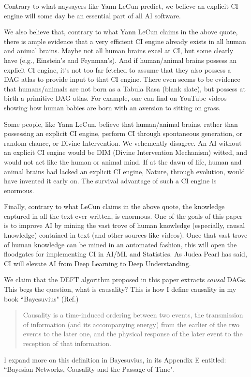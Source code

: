 \documentclass[12pt]{article}
\begin{document}
Contrary to what naysayers
like Yann LeCun predict,
we believe an 
explicit CI engine 
will some day be 
an essential part of all AI
software. 

We also believe that,
contrary to what Yann LeCun claims
in the above quote,
there is ample evidence
that a very efficient CI engine already 
exists in all human and animal 
brains. Maybe not 
all human brains 
excel at CI,
but some clearly have (e.g., Einstein's
and Feynman's). 
And if human/animal brains possess an explicit
CI engine, it's not 
too far fetched to assume
that they also possess a DAG atlas
to provide input to that CI engine.
There even seems to be evidence that 
humans/animals
are not born as a Tabula Rasa (blank slate),
but possess at birth a primitive DAG atlas.
For example, one can find on YouTube
videos showing how human babies
are born with an aversion to 
sitting on grass.

Some people, like
Yann LeCun,
 believe that
human/animal brains, rather than 
possessing an explicit CI 
engine, perform
CI through spontaneous generation, or
random chance, or
Divine Intervention.
We vehemently disagree.
An AI without
an explicit CI engine
would be DIM (Divine
Intervention Mechanism)
witted, and would
not act like the
human or animal mind.
If at the dawn of life,
human and animal brains
had lacked an explicit CI engine,
Nature,
through evolution, would have invented it early on. The 
survival
advantage of 
such a CI engine
is enormous.

Finally,
contrary to 
what LeCun
claims in the above quote,
the  knowledge 
captured in all the text
ever written,
is enormous. 
One of 
the goals of this
paper is to 
improve AI by
mining the vast
trove of
human knowledge 
(especially, causal knowledge)
contained in text (and other 
sources like videos).
Once that vast 
trove of human knowledge
can be mined in an automated 
fashion, this will
open the floodgates 
for implementing CI in AI/ML and Statistics.
As Judea Pearl has said,
CI will elevate AI 
from Deep Learning
to Deep Understanding.

We claim that the DEFT algorithm 
proposed in this paper
extracts {\it causal} DAGs. This
begs the question, what
is causality? This is 
how I define causality in my book
``Bayesuvius" (Ref.\cite{bayesuvius}) 
 
\begin{quote}
Causality is a time-induced ordering between two events, the transmission of information (and its accompanying energy) from the earlier of the two events to the later one, and the physical response of the later event to the reception of that information.
\end{quote}
I expand more on this definition in Bayesuvius, 
in its Appendix E
entitled: ``Bayesian Networks, Causality
and the Passage of Time".
\end{document}
